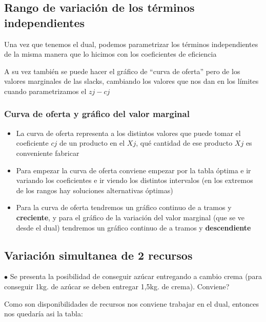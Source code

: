 \documentclass[titlepage,a4paper]{article}
\begin{document}
\subsection{Rango de variación de los términos independientes}

Una vez que tenemos el dual, podemos parametrizar los términos independientes de la misma manera que lo hicimos con los coeficientes de eficiencia

A su vez también se puede hacer el gráfico de “curva de oferta” pero de los valores marginales de las slacks, cambiando los valores que nos dan en los límites cuando parametrizamos el $zj-cj$

\vspace{1cm}

\subsubsection{Curva de oferta y gráfico del valor marginal}

\begin{itemize}
    \item La curva de oferta representa a los distintos valores que puede tomar el coeficiente $cj$ de un producto en el $Xj$, qué cantidad de ese producto $Xj$ es conveniente fabricar
    \item Para empezar la curva de oferta conviene empezar por la tabla óptima e ir variando los coeficientes e ir viendo los distintos intervalos (en los extremos de los rangos hay soluciones alternativas óptimas)
    \item Para la curva de oferta tendremos un gráfico continuo de a tramos y \textbf{creciente}, y para el gráfico de la variación del valor marginal (que se ve desde el dual) tendremos un gráfico continuo de a tramos y \textbf{descendiente}
\end{itemize}

\vspace{0.5cm}


\subsection{Variación simultanea de 2 recursos}

$\bullet$ Se presenta la posibilidad de conseguir azúcar entregando a cambio crema (para conseguir 1kg. de azúcar se deben entregar 1,5kg. de crema). Conviene?

Como son disponibilidades de recursos nos conviene trabajar en el dual, entonces nos quedaría asi la tabla:
\end{document}

